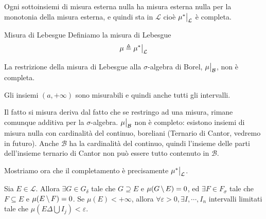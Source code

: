 \documentclass[a4paper]{article}
\begin{document}
\begin{radioactive}
Ogni sottoinsiemi di misura esterna nulla ha misura esterna nulla per la monotonia della misura esterna,
e quindi sta in \(\mathcal L\) cioè \(\restr{\mu^*}{\mathcal L}\) è completa.
\end{radioactive}

\begin{radioactive}
\begin{snippetdefinition}{Misura di Lebesgue}
    Definiamo la misura di Lebesgue
    \[
        \mu \triangleq \restr{\mu^*}{\mathcal L}
    \]
\end{snippetdefinition}
\end{radioactive}

\begin{radioactive}
\begin{snippettheorem}{}
    La restrizione della misura di Lebesgue alla \(\sigma\)-algebra di Borel,
    \(\restr{\mu}{\mathcal B}\), non è completa.
\end{snippettheorem}
\end{radioactive}

\begin{radioactive}
Gli insiemi \((a,+\infty)\)
sono misurabili e quindi anche tutti gli intervalli.
\end{radioactive}

\begin{radioactive}
\begin{snippetproof}{}
    Il fatto si misura deriva dal fatto che se restringo ad una misura, rimane
    comunque additiva per la \(\sigma\)-algebra.
    \(\restr{\mu}{\mathcal B}\) non è completo: esistono insiemi di misura nulla con
    cardinalità del continuo, boreliani (Ternario di Cantor, vedremo in futuro).
    Anche \(\mathcal B\) ha la cardinalità del continuo, quindi l'insieme delle parti
    dell'insieme ternario di Cantor non può essere tutto contenuto in \(\mathcal B\).
\end{snippetproof}
\end{radioactive}

\begin{radioactive}
Mostriamo ora che il completamento è precisamente \(\restr{\mu^*}{\mathcal L}\).
\end{radioactive}

\begin{radioactive}
\begin{snippetproposition}{}
    Sia \(E \in \mathcal L\). Allora \(\exists G \in G_\delta\) tale che
    \(G \supseteq E\) e \(\mu(G \,\backslash\, E) = 0\), ed
    \(\exists F \in F_\sigma\) tale che \(F \subseteq E\) e \(\mu(E \,\backslash\, F) = 0\).
    Se \(\mu(E) < +\infty\), allora \(\forall \varepsilon > 0, \exists I, \cdots, I_n\)
    intervalli limitati tale che \(\mu(E \Delta \bigcup I_j) < \varepsilon\).
\end{snippetproposition}
\end{radioactive}
\end{document}

